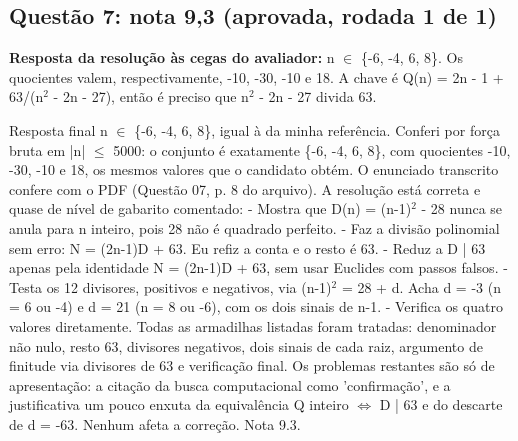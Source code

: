 \documentclass{article}%
\begin{document}
\subsection*{Questão 7: nota 9,3 (aprovada, rodada 1 de 1)}%
\textbf{Resposta da resolução às cegas do avaliador:} n $\in$ \{-6, -4, 6, 8\}. Os quocientes valem, respectivamente, -10, -30, -10 e 18. A chave é Q(n) = 2n - 1 + 63/(n$^2$ - 2n - 27), então é preciso que n$^2$ - 2n - 27 divida 63.\par %
Resposta final n $\in$ \{-6, -4, 6, 8\}, igual à da minha referência. Conferi por força bruta em |n| $\leq$ 5000: o conjunto é exatamente \{-6, -4, 6, 8\}, com quocientes -10, -30, -10 e 18, os mesmos valores que o candidato obtém. O enunciado transcrito confere com o PDF (Questão 07, p. 8 do arquivo).\newline%
\newline%
A resolução está correta e quase de nível de gabarito comentado:\newline%
{-} Mostra que D(n) = (n-1)$^2$ - 28 nunca se anula para n inteiro, pois 28 não é quadrado perfeito.\newline%
{-} Faz a divisão polinomial sem erro: N = (2n-1)D + 63. Eu refiz a conta e o resto é 63.\newline%
{-} Reduz a D | 63 apenas pela identidade N = (2n-1)D + 63, sem usar Euclides com passos falsos.\newline%
{-} Testa os 12 divisores, positivos e negativos, via (n-1)$^2$ = 28 + d. Acha d = -3 (n = 6 ou -4) e d = 21 (n = 8 ou -6), com os dois sinais de n-1.\newline%
{-} Verifica os quatro valores diretamente.\newline%
\newline%
Todas as armadilhas listadas foram tratadas: denominador não nulo, resto 63, divisores negativos, dois sinais de cada raiz, argumento de finitude via divisores de 63 e verificação final. Os problemas restantes são só de apresentação: a citação da busca computacional como 'confirmação', e a justificativa um pouco enxuta da equivalência Q inteiro $\Leftrightarrow$ D | 63 e do descarte de d = -63. Nenhum afeta a correção. Nota 9.3.%
\end{document}
